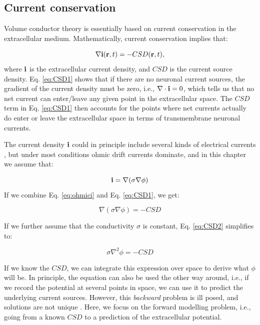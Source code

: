 \subsection{Current conservation}
Volume conductor theory is essentially based on current conservation in the extracellular medium. Mathematically, current conservation implies that:

\begin{equation}
\nabla {\bf i}({\bf r}, t) = - CSD({\bf r}, t),
\label{eq:CSD1}
\end{equation}
where ${\bf i}$ is the extracellular current density, and $CSD$ is the current source density. Eq. \ref{eq:CSD1} shows that if there are no neuronal current sources, the gradient of the current density must be zero, i.e., $\nabla \cdot {\bf i} = 0$, which tells us that no net current can enter/leave any given point in the extracellular space. The $CSD$ term in Eq. \ref{eq:CSD1} then accounts for  the points where net currents actually do enter or leave the extracellular space in terms of transmembrane neuronal currents.

The current density ${\bf i}$ could in principle include several kinds of electrical currents \cite{Gratiy2017}, but under most conditions ohmic drift currents dominate, and in this chapter we assume that:

\begin{equation}
{\bf i} = \nabla ({\sigma \nabla \phi})
\label{eq:ohmici}
\end{equation}
If we combine Eq. \ref{eq:ohmici} and Eq. \ref{eq:CSD1}, we get:

\begin{equation}
\nabla ({\sigma \nabla \phi}) = - CSD
\label{eq:CSD2}
\end{equation}

If we further assume that the conductivity $\sigma$ is constant, Eq. \ref{eq:CSD2} simplifies to:

\begin{equation}
\sigma \nabla^2 \phi = - CSD
\label{eq:CSD3}
\end{equation}

If we know the $CSD$, we can integrate this expression over space to derive what $\phi$ will be. In principle, the equation can also be used the other way around, i.e., if we record the potential at several points in space, we can use it to predict the underlying current sources. However, this \textit{backward} problem is ill posed, and solutions are not unique . Here, we focus on the forward modelling problem, i.e., going from a known $CSD$ to a prediction of the extracellular potential. 

